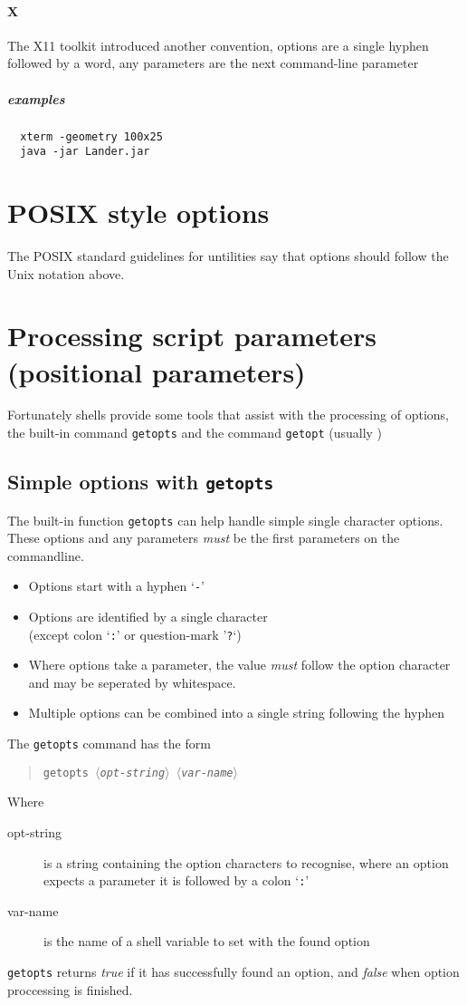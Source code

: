 \documentclass{article}
\newcommand{\required}[1]{$\langle$\itshape #1$\rangle$}
\begin{document}
\paragraph{X} The X11 toolkit introduced another convention, options are a single hyphen followed by a word, any parameters are the next command-line parameter
\subparagraph{examples}
\begin{verbatim}
  xterm -geometry 100x25
  java -jar Lander.jar
\end{verbatim}

\section{POSIX style options}
The POSIX standard guidelines for untilities say that options should follow the Unix notation above.
\section{Processing script parameters (positional parameters)}
Fortunately shells provide some tools that assist with the processing of options, the built-in command \verb'getopts' and the command \verb'getopt'  (usually )

\subsection{Simple options with \texttt{getopts}}
The built-in function \texttt{getopts} can help handle simple single character options.  These options and any parameters \emph{must} be the first parameters on the commandline.

\begin{itemize}
  \item Options start with a hyphen `\texttt{-}'
  \item Options are identified by a single character \\
        (except colon `\texttt{:}' or question-mark '\texttt{?}`)
  \item Where options take a parameter, the value \emph{must} follow the option character and may be seperated by whitespace.
  \item Multiple options can be combined into a single string following the hyphen
\end{itemize}

The \texttt{getopts} command has the form
\begin{quote}
\texttt{getopts \required{opt-string} \required{var-name}}
\end{quote}
Where
\begin{description}
  \item[opt-string] is a string containing the option characters to recognise, where an option expects a parameter it is followed by a colon `\texttt{:}'
  \item[var-name] is the name of a shell variable to set with the found option
\end{description}
\texttt{getopts} returns \textit{true} if it has successfully found an option, and \textit{false} when option proccessing is finished.
\end{document}

